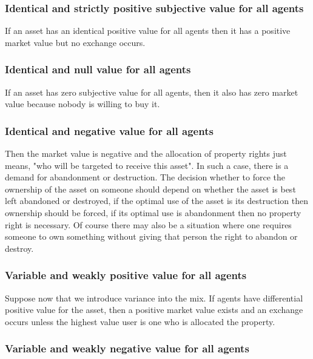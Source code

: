 \documentclass[12pt]{report}
\numberwithin{equation}{section}
\begin{document}
\subsubsection{Identical and strictly positive subjective value for all agents}

If an asset has an identical positive value for all agents then it has a positive market value but no exchange occurs.

\subsubsection{Identical and null value for all agents}

If an asset has zero subjective value for all agents, then it also has zero market value because nobody is willing to buy it.

\subsubsection{Identical and negative value for all agents}

Then the market value is negative and the allocation of property rights just means,  "who will be targeted to receive this asset". In such a case, there is a demand for abandonment or destruction. The decision whether to force the ownership of the asset on someone should depend on whether the asset is best left abandoned or destroyed, if the optimal use of the asset is its destruction then ownership should be forced, if its optimal use is abandonment then no property right is necessary. Of course there may also be a situation where one requires someone to own something without giving that person the right to abandon or destroy.

\subsubsection{Variable and weakly positive value for all agents}

Suppose now that we introduce variance into the mix. If agents have differential positive value for the asset, then a positive market value exists and an exchange occurs unless the highest value user is one who is allocated the property.

\subsubsection{Variable and weakly negative value for all agents}
\end{document}
